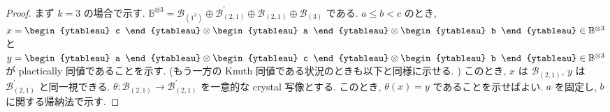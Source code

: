 \documentclass[
  a4paper, 
  12pt,
  ja=standard,
  xelatex,
  left=30truemm,
  right=30truemm,
  titlepage 
]{bxjsarticle}
\theoremstyle{definition}
\begin{document}
\begin{proof}
  まず $k = 3$ の場合で示す. $\mathbb{B}^{\otimes 3} = \mathcal{B}_{(1^3)} \oplus \mathcal{B}^{'}_{(2, 1)} \oplus \mathcal{B}_{(2, 1)} \oplus \mathcal{B}_{(3)}$
  である. $a \leq b < c$ のとき,
  $x = \begin{ytableau} c \end{ytableau} \otimes \begin{ytableau} a \end{ytableau} \otimes \begin{ytableau} b \end{ytableau} \in \mathbb{B}^{\otimes 3}$
  と $y = \begin{ytableau} a \end{ytableau} \otimes \begin{ytableau} c \end{ytableau} \otimes \begin{ytableau} b \end{ytableau} \in \mathbb{B}^{\otimes 3}$
  が plactically 同値であることを示す. (もう一方の Knuth 同値である状況のときも以下と同様に示せる. ) このとき,
  $x$ は $\mathcal{B}_{(2, 1)}$, $y$ は $\mathcal{B}^{'}_{(2, 1)}$ と同一視できる.
  $\theta: \mathcal{B}_{(2, 1)} \to \mathcal{B}^{'}_{(2, 1)}$ を一意的な crystal 写像とする.
  このとき, $\theta(x) = y$ であることを示せばよい. $a$ を固定し, $b$ に関する帰納法で示す.


\end{proof}
\end{document}
